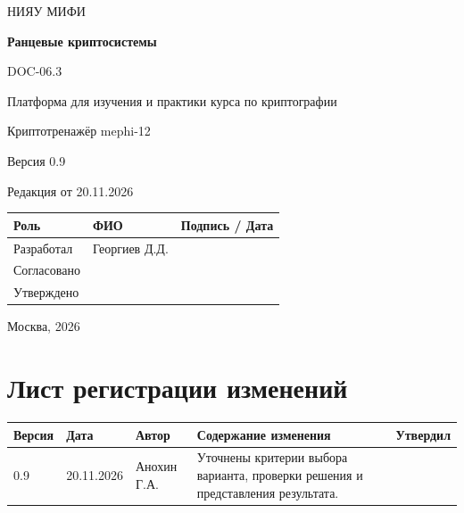 \documentclass[12pt,a4paper]{article}
\begin{document}
\hypersetup{pageanchor=false}
\begin{titlepage}
  \thispagestyle{empty}
  \centering
  {\large НИЯУ МИФИ\par}
  \vspace*{3.5cm}
  {\LARGE\bfseries Ранцевые криптосистемы\par}
  \vspace{0.5cm}
  {\large DOC-06.3\par}
  \vspace{0.6cm}
  {\large Платформа для изучения и практики курса по криптографии\par}
  {\large Криптотренажёр mephi-12\par}
  \vspace{0.7cm}
  {\large Версия 0.9\par}
  {\large Редакция от 20.11.2026\par}
  \vspace{1cm}
  \begin{tabularx}{\textwidth}{@{}p{3.4cm}Xp{4cm}@{}}
    \toprule
    Роль & ФИО & Подпись / Дата \\
    \midrule
    Разработал & Георгиев Д.Д. & \\
    \addlinespace[6pt]
    Согласовано & & \\
    \addlinespace[6pt]
    Утверждено & & \\
    \bottomrule
  \end{tabularx}
  \vfill
  {\large Москва, 2026\par}
\end{titlepage}
\hypersetup{pageanchor=true}

\section*{Лист регистрации изменений}
\begingroup\small\singlespacing
\noindent
\begin{tabularx}{\textwidth}{@{}p{1.2cm}p{2cm}p{2.5cm}Xp{1.8cm}@{}}
\toprule
Версия & Дата & Автор & Содержание изменения & Утвердил \\
\midrule
0.9 & 20.11.2026 & Анохин Г.А. & Уточнены критерии выбора варианта, проверки решения и представления результата. & \\
\bottomrule
\end{tabularx}
\endgroup
\clearpage
\begingroup\small\singlespacing
\tableofcontents
\endgroup
\clearpage

\hypertarget{doc-063-ранцевые-криптосистемы}{}
\end{document}
